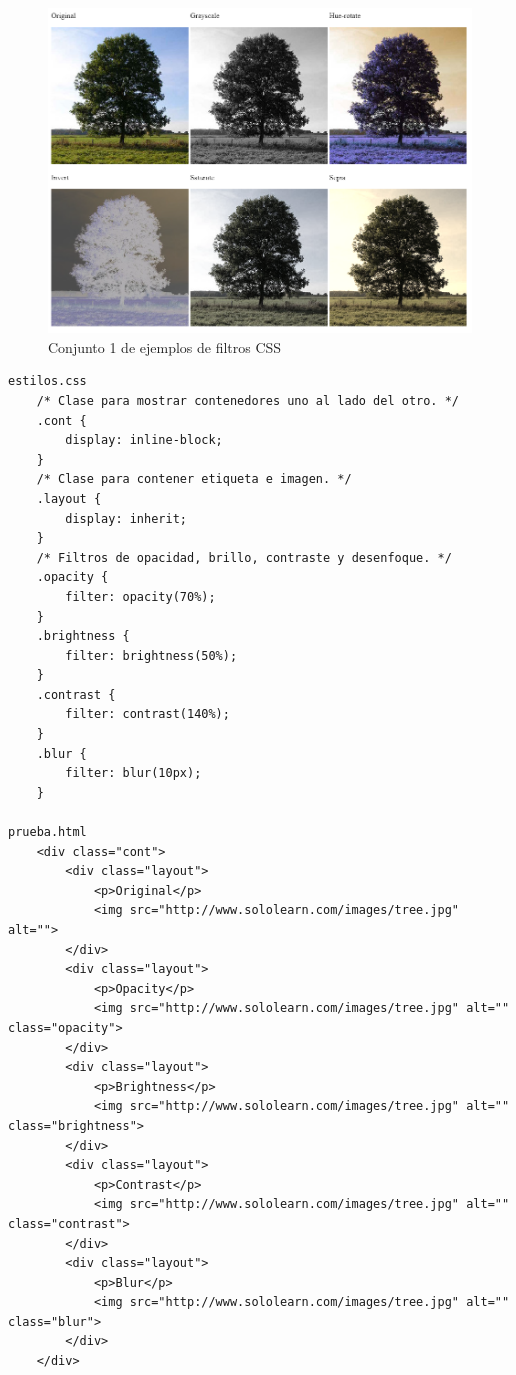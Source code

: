 \begin{figure}[H]
    \centering
    \caption{Conjunto 1 de ejemplos de filtros CSS}
    \label{fig: 59}
    \includegraphics[width=14cm]{ss/filter-examples-1.png}
\end{figure}
\begin{lstlisting}
estilos.css
    /* Clase para mostrar contenedores uno al lado del otro. */
    .cont {
        display: inline-block;
    }
    /* Clase para contener etiqueta e imagen. */
    .layout {
        display: inherit;
    }
    /* Filtros de opacidad, brillo, contraste y desenfoque. */
    .opacity {
        filter: opacity(70%);
    }
    .brightness {
        filter: brightness(50%);
    }
    .contrast {
        filter: contrast(140%);
    }
    .blur {
        filter: blur(10px);
    }

prueba.html
    <div class="cont">
        <div class="layout">
            <p>Original</p>
            <img src="http://www.sololearn.com/images/tree.jpg" alt="">
        </div>
        <div class="layout">
            <p>Opacity</p>
            <img src="http://www.sololearn.com/images/tree.jpg" alt="" class="opacity">
        </div>
        <div class="layout">
            <p>Brightness</p>
            <img src="http://www.sololearn.com/images/tree.jpg" alt="" class="brightness">
        </div>
        <div class="layout">
            <p>Contrast</p>
            <img src="http://www.sololearn.com/images/tree.jpg" alt="" class="contrast">
        </div>
        <div class="layout">
            <p>Blur</p>
            <img src="http://www.sololearn.com/images/tree.jpg" alt="" class="blur">
        </div>
    </div>
\end{lstlisting}
